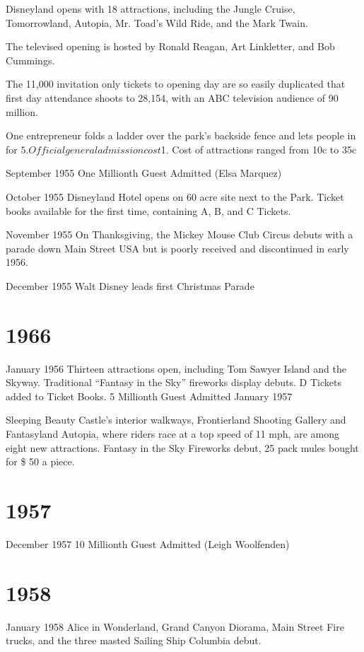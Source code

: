 Disneyland opens with 18 attractions, including the Jungle Cruise, Tomorrowland, Autopia, Mr. Toad’s Wild Ride, and the Mark Twain.

The televised opening is hosted by Ronald Reagan, Art Linkletter, and Bob Cummings.

The 11,000 invitation only tickets to opening day are so easily duplicated that first day attendance shoots to 28,154, with an ABC television audience of 90 million.

One entrepreneur folds a ladder over the park’s backside fence and lets people in for $5.

Official general admission cost $1. Cost of attractions ranged from 10c to 35c

September 1955
One Millionth Guest Admitted (Elsa Marquez)

October 1955
Disneyland Hotel opens on 60 acre site next to the Park.
Ticket books available for the first time, containing A, B, and C Tickets.

November 1955
On Thanksgiving, the Mickey Mouse Club Circus debuts with a parade down Main Street USA but is poorly received and discontinued in early 1956.

December 1955
Walt Disney leads first Christmas Parade

\section{1966}
January 1956
Thirteen attractions open, including Tom Sawyer Island and the Skyway.  Traditional “Fantasy in the Sky” fireworks display debuts.  D Tickets added to Ticket Books.  5 Millionth Guest Admitted January 1957

Sleeping Beauty Castle’s interior walkways, Frontierland Shooting Gallery and Fantasyland Autopia, where riders race at a top speed of 11 mph, are among eight new attractions.  Fantasy in the Sky Fireworks debut, 25 pack mules bought for \$ 50 a piece.
\section{1957}
December 1957
10 Millionth Guest Admitted (Leigh Woolfenden)
\section{1958}
January 1958
Alice in Wonderland, Grand Canyon Diorama, Main Street Fire trucks, and the three masted Sailing Ship Columbia debut.

